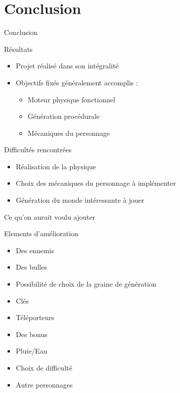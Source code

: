 \documentclass{beamer}
\begin{document}
{\section{Conclusion}
\begin{frame}{Conclusion}
    \begin{block}{R\'esultats}
        \begin{itemize}
            \item[\bullet] Projet réalisé dans son intégralité
            \item[\bullet] Objectifs fixés généralement accomplis :
            \begin{itemize}
                \item[\rightarrow] Moteur physique fonctionnel
                \item[\rightarrow] Génération procédurale
                \item[\rightarrow] Mécaniques du personnage
            \end{itemize}   
        \end{itemize}
    \end{block}
    \begin{block}{Difficultés rencontrées}
        \begin{itemize}
            \item[\bullet] Réalisation de la physique
            \item[\bullet] Choix des mécaniques du personnage à implémenter
            \item[\bullet] Génération du monde intéressante à jouer
        \end{itemize}
    \end{block}
\end{frame}

\begin{frame}{Ce qu'on aurait voulu ajouter}
    \begin{block}{Elements d'amélioration}
        \begin{itemize}
          \item[\bullet] Des ennemis
          \item[\bullet] Des bulles
          \item[\bullet] Possibilité de choix de la graine de génération
                  \item[\bullet] Clés
          \item[\bullet] Téléporteurs
          \item[\bullet] Des bonus
          \item[\bullet] Pluie/Eau
          \item[\bullet] Choix de difficulté
          \item[\bullet] Autre personnages
        \end{itemize}
    \end{block}
\end{frame}

}
\end{document}
